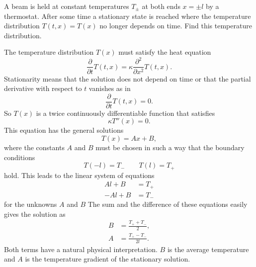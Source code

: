A beam is held at constant temperatures $T_\pm$ at both ends $x=\pm l$
by a thermostat.
After some time a stationary state is reached where the temperature
distribution
$T(t,x)=T(x)$ no longer depends on time.
Find this temperature distribution.

\begin{loesung}
The temperature distribution $T(x)$ must satisfy the heat equation
\[
\frac{\partial}{\partial t}T(t,x)=
\kappa\frac{\partial^2}{\partial x^2}T(t,x).
\]
Stationarity means that the solution does not depend on time or that
the partial derivative with respect to $t$ vanishes as in
\[
\frac{\partial}{\partial t}T(t,x)=0.
\]
So $T(x)$ is a twice continuously differentiable function that 
satisfies
\[
\kappa T''(x)=0.
\]
This equation has the general solutions
\[
T(x)=Ax+B,
\]
where the constants $A$ and $B$ must be chosen in such a way that the
boundary conditions 
\[
T(-l)=T_-\qquad T(l)=T_+
\]
hold.
This leads to the linear system of equations
\begin{align*}
Al+B&=T_+\\
-Al+B&=T_-
\end{align*}
for the unknowns $A$ and $B$
The sum and the difference of these equations easily gives the solution as
\begin{align*}
B&=\frac{T_++T_-}{2},
\\
A&=\frac{T_+-T_-}{2l}.
\end{align*}
Both terms have a natural physical interpretation.
$B$ is the average temperature and $A$ is the temperature gradient
of the stationary solution.
\end{loesung}
